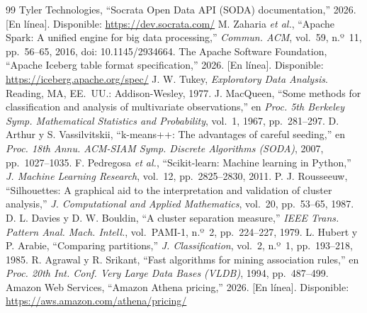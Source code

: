 \documentclass[conference,a4paper]{IEEEtran}
\begin{document}
\begin{thebibliography}{99}
 Tyler Technologies, ``Socrata Open Data API (SODA) documentation,'' 2026. [En línea]. Disponible: \url{https://dev.socrata.com/}
 M. Zaharia \emph{et al.}, ``Apache Spark: A unified engine for big data processing,'' \emph{Commun. ACM}, vol.~59, n.º~11, pp.~56--65, 2016, doi: 10.1145/2934664.
 The Apache Software Foundation, ``Apache Iceberg table format specification,'' 2026. [En línea]. Disponible: \url{https://iceberg.apache.org/spec/}
 J. W. Tukey, \emph{Exploratory Data Analysis}. Reading, MA, EE.~UU.: Addison-Wesley, 1977.
 J. MacQueen, ``Some methods for classification and analysis of multivariate observations,'' en \emph{Proc. 5th Berkeley Symp. Mathematical Statistics and Probability}, vol.~1, 1967, pp.~281--297.
 D. Arthur y S. Vassilvitskii, ``k-means++: The advantages of careful seeding,'' en \emph{Proc. 18th Annu. ACM-SIAM Symp. Discrete Algorithms (SODA)}, 2007, pp.~1027--1035.
 F. Pedregosa \emph{et al.}, ``Scikit-learn: Machine learning in Python,'' \emph{J. Machine Learning Research}, vol.~12, pp.~2825--2830, 2011.
 P. J. Rousseeuw, ``Silhouettes: A graphical aid to the interpretation and validation of cluster analysis,'' \emph{J. Computational and Applied Mathematics}, vol.~20, pp.~53--65, 1987.
 D. L. Davies y D. W. Bouldin, ``A cluster separation measure,'' \emph{IEEE Trans. Pattern Anal. Mach. Intell.}, vol.~PAMI-1, n.º~2, pp.~224--227, 1979.
 L. Hubert y P. Arabie, ``Comparing partitions,'' \emph{J. Classification}, vol.~2, n.º~1, pp.~193--218, 1985.
 R. Agrawal y R. Srikant, ``Fast algorithms for mining association rules,'' en \emph{Proc. 20th Int. Conf. Very Large Data Bases (VLDB)}, 1994, pp.~487--499.
 Amazon Web Services, ``Amazon Athena pricing,'' 2026. [En línea]. Disponible: \url{https://aws.amazon.com/athena/pricing/}
\end{thebibliography}
\end{document}

